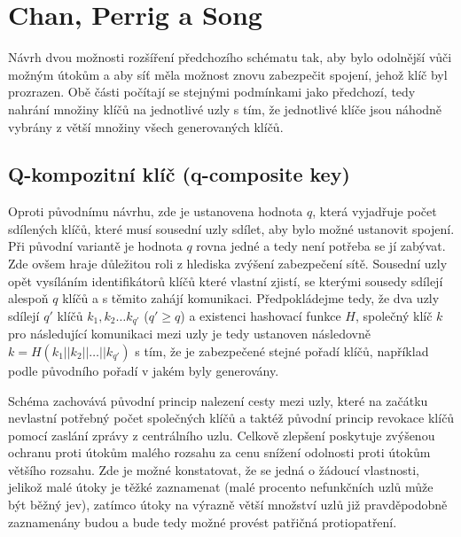 \documentclass[11pt,final,twoside]{fithesis2}
\begin{document}
\section{Chan, Perrig a Song} \label{sec:Chan}
Návrh dvou možnosti rozšíření \cite{Perrig2003} předchozího schématu \cite{Eschenauer2002} tak, aby bylo odolnější vůči možným útokům a aby síť měla možnost znovu zabezpečit spojení, jehož
klíč byl prozrazen. Obě části počítají se stejnými podmínkami jako předchozí, tedy nahrání množiny klíčů na jednotlivé uzly s tím, že jednotlivé klíče jsou náhodně vybrány 
z větší množiny všech generovaných klíčů.

\subsection{Q-kompozitní klíč (q-composite key)}
Oproti původnímu návrhu, zde je ustanovena hodnota $q$, která vyjadřuje počet sdílených klíčů, které musí sousední uzly sdílet, aby bylo možné ustanovit spojení. Při původní variantě 
je hodnota $q$ rovna jedné a tedy není potřeba se jí zabývat. Zde ovšem hraje důležitou roli z hlediska zvýšení zabezpečení sítě. Sousední uzly opět vysíláním identifikátorů klíčů které vlastní
zjistí, se kterými sousedy sdílejí alespoň $q$ klíčů a s těmito zahájí komunikaci. Předpokládejme tedy, že dva uzly sdílejí $q'$ klíčů $k_1, k_2 \dots k_{q'}$ ($q' \ge q$) a existenci hashovací funkce $H$, 
společný klíč $k$ pro následující komunikaci mezi uzly je tedy ustanoven následovně $k=H(k_1 || k_2 || \dots || k_{q'})$ s tím, že je zabezpečené stejné pořadí klíčů, například podle původního
pořadí v jakém byly generovány. 

Schéma zachovává původní princip nalezení cesty mezi uzly, které na začátku nevlastní potřebný počet společných klíčů a taktéž původní princip revokace klíčů pomocí zaslání zprávy z 
centrálního uzlu. Celkově zlepšení poskytuje zvýšenou ochranu proti útokům malého rozsahu za cenu snížení odolnosti proti útokům většího rozsahu. Zde je možné konstatovat, že se jedná 
o žádoucí vlastnosti, jelikož malé útoky je těžké zaznamenat (malé procento nefunkčních uzlů může být běžný jev), zatímco útoky na výrazně větší množství uzlů již pravděpodobně zaznamenány budou a 
bude tedy možné provést patřičná protiopatření. 
\end{document}
